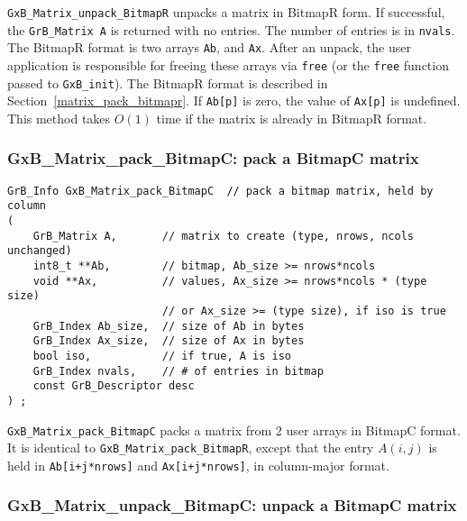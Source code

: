 \documentclass[12pt]{article}
\begin{document}
{\verb'GxB_Matrix_unpack_BitmapR' unpacks a matrix in BitmapR form.
If successful, the \verb'GrB_Matrix A' is returned with no entries.
The number of entries is in \verb'nvals'.
The BitmapR format is two arrays \verb'Ab', and \verb'Ax'.  After an
unpack, the user application is responsible for freeing these
arrays via \verb'free' (or the \verb'free' function passed to \verb'GxB_init').
The BitmapR format is described in Section~\ref{matrix_pack_bitmapr}.
If \verb'Ab[p]' is zero, the value of \verb'Ax[p]' is undefined.
This method takes $O(1)$ time if the matrix is already in BitmapR format.

\newpage
\subsubsection{{\sf GxB\_Matrix\_pack\_BitmapC:} pack a BitmapC matrix}
\label{matrix_pack_bitmapc}

\begin{mdframed}[userdefinedwidth=6in]
{\footnotesize
\begin{verbatim}
GrB_Info GxB_Matrix_pack_BitmapC  // pack a bitmap matrix, held by column
(
    GrB_Matrix A,       // matrix to create (type, nrows, ncols unchanged)
    int8_t **Ab,        // bitmap, Ab_size >= nrows*ncols
    void **Ax,          // values, Ax_size >= nrows*ncols * (type size)
                        // or Ax_size >= (type size), if iso is true
    GrB_Index Ab_size,  // size of Ab in bytes
    GrB_Index Ax_size,  // size of Ax in bytes
    bool iso,           // if true, A is iso
    GrB_Index nvals,    // # of entries in bitmap
    const GrB_Descriptor desc
) ;
\end{verbatim}
} \end{mdframed}

\verb'GxB_Matrix_pack_BitmapC' packs a matrix from 2 user arrays in BitmapC
format.  It is identical to \verb'GxB_Matrix_pack_BitmapR', except that the
entry $A(i,j)$ is held in \verb'Ab[i+j*nrows]' and \verb'Ax[i+j*nrows]',
in column-major format.

\subsubsection{{\sf GxB\_Matrix\_unpack\_BitmapC:} unpack a BitmapC matrix}
\label{matrix_unpack_bitmapc}

}
\end{document}
